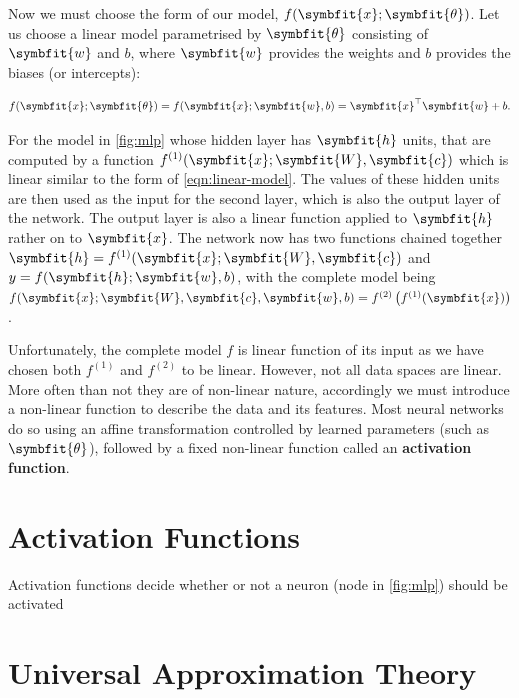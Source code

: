 Now we must choose the form of our model, $f(\symbfit{x};\symbfit{\theta})$. Let us choose a linear model parametrised by $\symbfit{\theta}$ consisting of $\symbfit{w}$ and $b$, where $\symbfit{w}$ provides the weights and $b$ provides the biases (or intercepts):

\begin{equation}\label{eqn:linear-model}
    f(\symbfit{x}; \symbfit{\theta}) = f(\symbfit{x} ; \symbfit{w}, b)=\symbfit{x}^{\top} \symbfit{w} + b.
\end{equation}

For the model in \cref{fig:mlp} whose hidden layer has $\symbfit{h}$ units, that are computed by a function \(f^{(1)}(\symbfit{x}; \symbfit{W}, \symbfit{c})\) which is linear similar to the form of \cref{eqn:linear-model}. The values of these hidden units are then used as the input for the second layer, which is also the output layer of the network. The output layer is also a linear function applied to $\symbfit{h}$ rather on to $\symbfit{x}$.
The network now has two functions chained together \(\symbfit{h} = f^{(1)}(\symbfit{x}; \symbfit{W}, \symbfit{c})\) and \(y = f(\symbfit{h} ; \symbfit{w}, b)\), with the complete model being $f(\symbfit{x} ; \symbfit{W}, \symbfit{c}, \symbfit{w}, b)=f^{(2)}\left(f^{(1)}(\symbfit{x})\right)$. 

Unfortunately, the complete model $f$ is linear function of its input as we have chosen both $f^{(1)}$ and $f^{(2)}$ to be linear. 
However, not all data spaces are linear. More often than not they are of non-linear nature, accordingly we must introduce a non-linear function to describe the data and its features.
Most neural networks do so using an affine transformation controlled by learned parameters (such as $\symbfit{\theta}$), followed by a fixed non-linear function called an \textbf{activation function}.

\section{Activation Functions} \label{sec:activation-functions}

Activation functions decide whether or not a neuron (node in \cref{fig:mlp}) should be activated 


\section{Universal Approximation Theory}\label{sec:uat}

